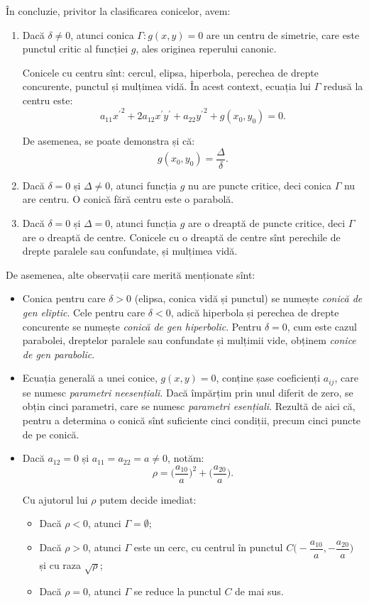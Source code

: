 \documentclass[11pt,a4paper]{article}
\theoremstyle{dotless}
\theoremstyle{dotlessdr}
\begin{document}
În concluzie, privitor la clasificarea conicelor, avem:
\begin{enumerate}[(1)]
	\item Dacă $\delta \neq 0$, atunci conica $\Gamma : g(x,y) = 0$ are un
centru de simetrie, care este punctul critic al funcției $g$, ales originea
reperului canonic. 

Conicele cu centru sînt: cercul, elipsa, hiperbola, perechea de drepte 
concurente, punctul și mulțimea vidă. În acest context, ecuația lui $\Gamma$ 
redusă la centru este: 
 \[
	a_{11} {x^{\prime}}^2 + 2a_{12} x^{\prime} y^{\prime} + 
	a_{22} {y^{\prime}}^2 + g(x_0, y_0) = 0.
\]

De asemenea, se poate demonstra și că: 
 \[
	g(x_0, y_0) = \dfrac{\Delta}{\delta}.
\]

    \item Dacă $\delta = 0$ și $\Delta \neq 0$, atunci funcția $g$ nu are puncte
critice, deci conica $\Gamma$ nu are centru. O conică fără centru este o 
parabolă.

    \item Dacă $\delta = 0$ și $\Delta = 0$, atunci funcția $g$ are o dreaptă
de puncte critice, deci $\Gamma$ are o dreaptă de centre. Conicele cu o dreaptă
de centre sînt perechile de drepte paralele sau confundate, și mulțimea vidă.
\end{enumerate}

De asemenea, alte observații care merită menționate sînt:
\begin{itemize}
	\item Conica pentru care $\delta > 0$ (elipsa, conica vidă și punctul) se 
numește \emph{conică de gen eliptic}. Cele pentru care $\delta < 0$, adică
hiperbola și perechea de drepte concurente se numește \emph{conică de gen
hiperbolic}. Pentru $\delta = 0$, cum este cazul parabolei, dreptelor paralele
sau confundate și mulțimii vide, obținem \emph{conice de gen parabolic}.

    \item Ecuația generală a unei conice, $g(x,y) = 0$, conține șase 
coeficienți $a_{ij}$, care se numesc \emph{parametri neesențiali}. Dacă împărțim
prin unul diferit de zero, se obțin cinci parametri, care se numesc 
\emph{parametri esențiali}. Rezultă de aici că, pentru a determina o conică sînt
suficiente cinci condiții, precum cinci puncte de pe conică.

    \item Dacă $a_{12} = 0$ și $a_{11} = a_{22} = a \neq 0$, notăm: 
 \[
	\rho = \Big( \dfrac{a_{10}}{a} \Big)^2 + \Big( \dfrac{a_{20}}{a} \Big).
\]

Cu ajutorul lui $\rho$ putem decide imediat:
\begin{itemize}
	\item Dacă $\rho < 0$, atunci $\Gamma = \emptyset$;
	\item Dacă $\rho > 0$, atunci $\Gamma$ este un cerc, cu centrul în punctul
$C \Big( -\dfrac{a_{10}}{a}, -\dfrac{a_{20}}{a} \Big)$ și cu raza $\sqrt{\rho}$;
    \item Dacă $\rho = 0$, atunci $\Gamma$ se reduce la punctul $C$ de mai sus.
\end{itemize}
\end{itemize}
\end{document}
